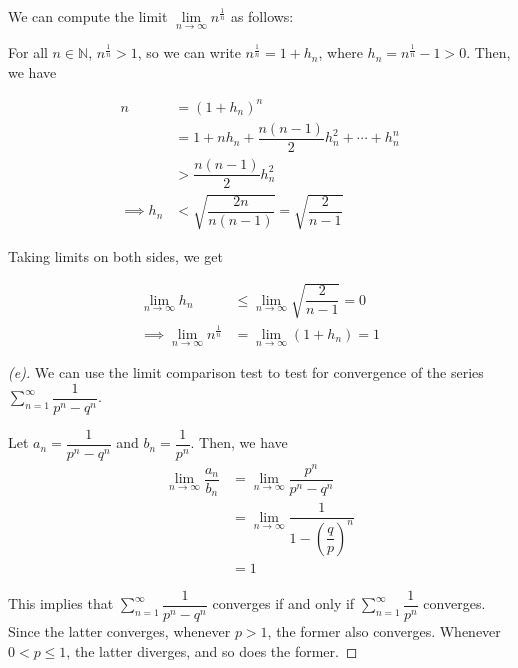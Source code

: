 \documentclass{article}
\begin{document}

\begin{remark*}[$\lim n^{\frac{1}{n}} = 1$]
    We can compute the limit $\lim\limits_{n \to \infty} n^{\frac{1}{n}}$ as follows:

    For all $n \in \mathbb{N}$, $n^{\frac{1}{n}} > 1$, so we can write $n^{\frac{1}{n}} = 1 + h_n$, where $h_n = n^{\frac{1}{n}} - 1 > 0$. Then, we have

    \begin{align*}
        n &= (1 + h_n)^n \\
        &= 1 + nh_n + \dfrac{n(n-1)}{2} h_n^2 + \cdots + h_n^n \\
        &> \dfrac{n(n-1)}{2} h_n^2 \\
        \implies h_n &< \sqrt{\dfrac{2n}{n(n-1)}} = \sqrt{\dfrac{2}{n-1}}
    \end{align*}

    Taking limits on both sides, we get

    \begin{align*}
        \lim\limits_{n \to \infty} h_n &\leq \lim\limits_{n \to \infty} \sqrt{\dfrac{2}{n-1}} = 0 \\
        \implies \lim\limits_{n \to \infty} n^{\frac{1}{n}} &= \lim\limits_{n \to \infty} (1 + h_n) = 1
    \end{align*}
\end{remark*}

\begin{proof}[(e)]
    We can use the limit comparison test to test for convergence of the series $\displaystyle\sum_{n=1}^{\infty} \dfrac{1}{p^n - q^n}$.

    Let $a_n = \dfrac{1}{p^n - q^n}$ and $b_n = \dfrac{1}{p^n}$. Then, we have
    \begin{align*}
        \lim\limits_{n \to \infty} \dfrac{a_n}{b_n} 
        &= \lim\limits_{n \to \infty} \dfrac{p^n}{p^n - q^n} \\
        &= \lim\limits_{n \to \infty} \dfrac{1}{1 - \left(\dfrac{q}{p}\right)^n} \\
        &= 1
    \end{align*}

    This implies that $\displaystyle\sum_{n=1}^{\infty} \dfrac{1}{p^n - q^n}$ converges if and only if $\displaystyle\sum_{n=1}^{\infty} \dfrac{1}{p^n}$ converges. Since the latter converges, whenever $p > 1$, the former also converges. Whenever $0 < p \leq 1$, the latter diverges, and so does the former.
\end{proof}
\end{document}
